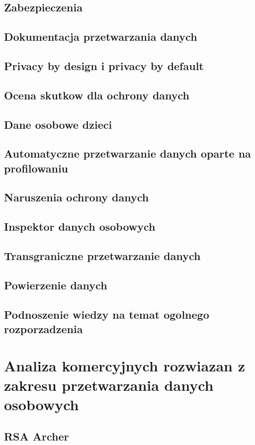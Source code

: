 \documentclass[en, noamssymb]{mgr}
\begin{document}
\section{Zabezpieczenia}
\section{Dokumentacja przetwarzania danych}
\section{Privacy by design i privacy by default}
\section{Ocena skutkow dla ochrony danych}
\section{Dane osobowe dzieci}
\section{Automatyczne przetwarzanie danych oparte na profilowaniu}
\section{Naruszenia ochrony danych}
\section{Inspektor danych osobowych}
\section{Transgraniczne przetwarzanie danych}
\section{Powierzenie danych}
\section{Podnoszenie wiedzy na temat ogolnego rozporzadzenia}

\chapter{Analiza komercyjnych rozwiazan z zakresu przetwarzania danych osobowych} \label{sec:sekcjaAnalizaRozwiazan}
\section{RSA Archer}
\end{document}
